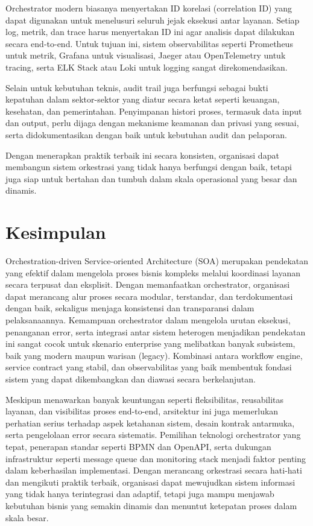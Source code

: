 Orchestrator modern biasanya menyertakan ID korelasi (correlation ID) yang dapat digunakan untuk menelusuri seluruh jejak eksekusi antar layanan. Setiap log, metrik, dan trace harus menyertakan ID ini agar analisis dapat dilakukan secara end-to-end. Untuk tujuan ini, sistem observabilitas seperti Prometheus untuk metrik, Grafana untuk visualisasi, Jaeger atau OpenTelemetry untuk tracing, serta ELK Stack atau Loki untuk logging sangat direkomendasikan.

Selain untuk kebutuhan teknis, audit trail juga berfungsi sebagai bukti kepatuhan dalam sektor-sektor yang diatur secara ketat seperti keuangan, kesehatan, dan pemerintahan. Penyimpanan histori proses, termasuk data input dan output, perlu dijaga dengan mekanisme keamanan dan privasi yang sesuai, serta didokumentasikan dengan baik untuk kebutuhan audit dan pelaporan.

Dengan menerapkan praktik terbaik ini secara konsisten, organisasi dapat membangun sistem orkestrasi yang tidak hanya berfungsi dengan baik, tetapi juga siap untuk bertahan dan tumbuh dalam skala operasional yang besar dan dinamis.


\section{Kesimpulan}

Orchestration-driven Service-oriented Architecture (SOA) merupakan pendekatan yang efektif dalam mengelola proses bisnis kompleks melalui koordinasi layanan secara terpusat dan eksplisit. Dengan memanfaatkan orchestrator, organisasi dapat merancang alur proses secara modular, terstandar, dan terdokumentasi dengan baik, sekaligus menjaga konsistensi dan transparansi dalam pelaksanaannya. Kemampuan orchestrator dalam mengelola urutan eksekusi, penanganan error, serta integrasi antar sistem heterogen menjadikan pendekatan ini sangat cocok untuk skenario enterprise yang melibatkan banyak subsistem, baik yang modern maupun warisan (legacy). Kombinasi antara workflow engine, service contract yang stabil, dan observabilitas yang baik membentuk fondasi sistem yang dapat dikembangkan dan diawasi secara berkelanjutan.

Meskipun menawarkan banyak keuntungan seperti fleksibilitas, reusabilitas layanan, dan visibilitas proses end-to-end, arsitektur ini juga memerlukan perhatian serius terhadap aspek ketahanan sistem, desain kontrak antarmuka, serta pengelolaan error secara sistematis. Pemilihan teknologi orchestrator yang tepat, penerapan standar seperti BPMN dan OpenAPI, serta dukungan infrastruktur seperti message queue dan monitoring stack menjadi faktor penting dalam keberhasilan implementasi. Dengan merancang orkestrasi secara hati-hati dan mengikuti praktik terbaik, organisasi dapat mewujudkan sistem informasi yang tidak hanya terintegrasi dan adaptif, tetapi juga mampu menjawab kebutuhan bisnis yang semakin dinamis dan menuntut ketepatan proses dalam skala besar.
